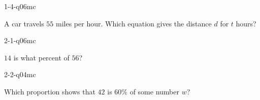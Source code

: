 \documentclass[12pt, fleqn, openany]{studyGuide}
\begin{document}
\renewcommand{\VMBookTitle}{5 Full-Length Virginia SOL Grade 7 Math Practice Tests}
\renewcommand{\VMBookSubtitle}{Extra Practice for Test Day Success}
\renewcommand{\VMFooterURL}{https://viewmath.com/grade7}
\renewcommand{\VMFooterURLDisplay}{ViewMath.com/Grade7}






\tableofcontents
\cleardoublepage
{}


\begin{practiceQuestion}{1-4-q06}{mc}
\begin{questionText}
A car travels $55$ miles per hour. Which equation gives the distance $d$ for $t$ hours?
\end{questionText}
\end{practiceQuestion}

\begin{practiceQuestion}{2-1-q06}{mc}
\begin{questionText}
$14$ is what percent of $56$?
\end{questionText}
\end{practiceQuestion}

\begin{practiceQuestion}{2-2-q04}{mc}
\begin{questionText}
Which proportion shows that $42$ is $60\%$ of some number $w$?
\end{questionText}
\end{practiceQuestion}
\end{document}
